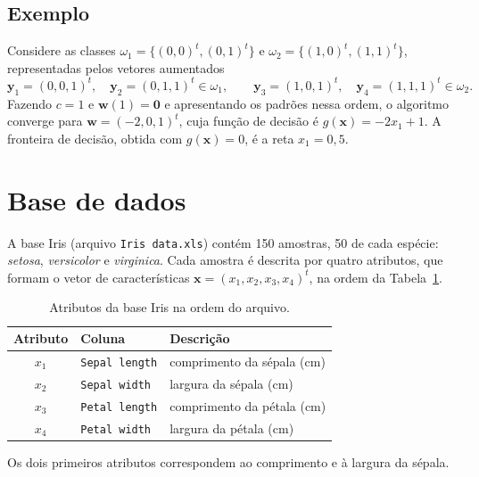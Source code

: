 \documentclass[12pt,a4paper]{article}
\begin{document}
\subsection{Exemplo}\label{sec:exemplo}

Considere as classes $\omega_1 = \{(0,0)^t, (0,1)^t\}$ e $\omega_2 = \{(1,0)^t, (1,1)^t\}$, representadas pelos vetores aumentados
\[
  \mathbf{y}_1 = (0,0,1)^t,\quad \mathbf{y}_2 = (0,1,1)^t \in \omega_1, \qquad
  \mathbf{y}_3 = (1,0,1)^t,\quad \mathbf{y}_4 = (1,1,1)^t \in \omega_2.
\]
Fazendo $c = 1$ e $\mathbf{w}(1) = \mathbf{0}$ e apresentando os padrões nessa ordem, o algoritmo converge para $\mathbf{w} = (-2, 0, 1)^t$, cuja função de decisão é $g(\mathbf{x}) = -2x_1 + 1$. A fronteira de decisão, obtida com $g(\mathbf{x}) = 0$, é a reta $x_1 = 0{,}5$.

\section{Base de dados}

A base Iris (arquivo \texttt{Iris data.xls}) contém 150 amostras, 50 de cada espécie: \emph{setosa}, \emph{versicolor} e \emph{virginica}. Cada amostra é descrita por quatro atributos, que formam o vetor de características $\mathbf{x} = (x_1, x_2, x_3, x_4)^t$, na ordem da Tabela~\ref{tab:atributos}.

\begin{table}[H]
\centering
\caption{Atributos da base Iris na ordem do arquivo.}
\label{tab:atributos}
\begin{tabular}{cll}
\toprule
Atributo & Coluna & Descrição \\
\midrule
$x_1$ & \texttt{Sepal length} & comprimento da sépala (cm) \\
$x_2$ & \texttt{Sepal width}  & largura da sépala (cm) \\
$x_3$ & \texttt{Petal length} & comprimento da pétala (cm) \\
$x_4$ & \texttt{Petal width}  & largura da pétala (cm) \\
\bottomrule
\end{tabular}
\end{table}

Os dois primeiros atributos correspondem ao comprimento e à largura da sépala.

\end{document}
